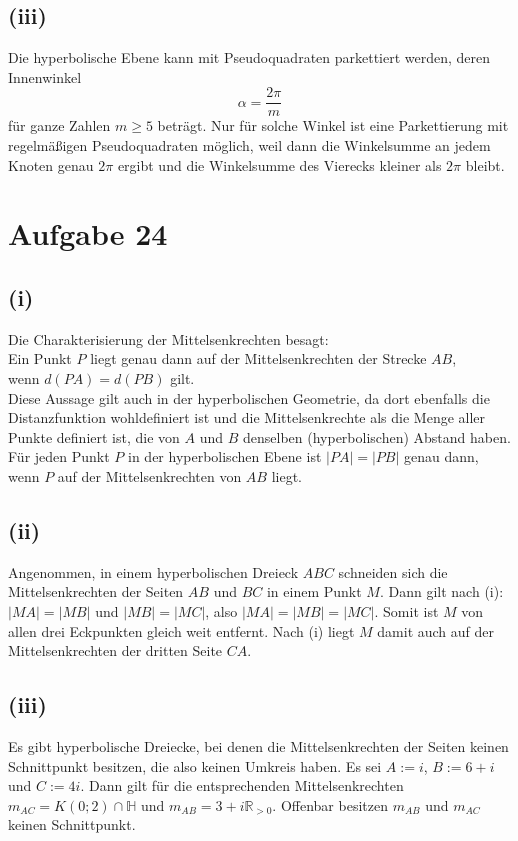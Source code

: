 \documentclass[12pt,a4paper]{article}
\begin{document}
\subsection*{(iii)}
Die hyperbolische Ebene kann mit Pseudoquadraten parkettiert werden, deren Innenwinkel
\[
\alpha = \frac{2\pi}{m}
\]
für ganze Zahlen \(m \geq 5\) beträgt. Nur für solche Winkel ist eine Parkettierung mit regelmäßigen Pseudoquadraten möglich, weil dann die Winkelsumme an jedem Knoten genau \(2\pi\) ergibt und die Winkelsumme des Vierecks kleiner als \(2\pi\) bleibt.

\newpage
\section*{Aufgabe 24}
\subsection*{(i)}
Die Charakterisierung der Mittelsenkrechten besagt: \\
Ein Punkt $P$ liegt genau dann auf der Mittelsenkrechten der Strecke $AB$, \\ 
wenn $d(PA) = d(PB)$ gilt.\\
Diese Aussage gilt auch in der hyperbolischen Geometrie, da dort ebenfalls die Distanzfunktion wohldefiniert ist und die Mittelsenkrechte als die Menge aller Punkte definiert ist, die von $A$ und $B$ denselben (hyperbolischen) Abstand haben.  
Für jeden Punkt $P$ in der hyperbolischen Ebene ist $|PA| = |PB|$ genau dann, wenn $P$ auf der Mittelsenkrechten von $AB$ liegt.

\subsection*{(ii)}
Angenommen, in einem hyperbolischen Dreieck $ABC$ schneiden sich die Mittelsenkrechten der Seiten $AB$ und $BC$ in einem Punkt $M$.  
Dann gilt nach (i): $|MA| = |MB|$ und $|MB| = |MC|$, also $|MA| = |MB| = |MC|$.  
Somit ist $M$ von allen drei Eckpunkten gleich weit entfernt.  
Nach (i) liegt $M$ damit auch auf der Mittelsenkrechten der dritten Seite $CA$.

\subsection*{(iii)}
Es gibt hyperbolische Dreiecke, bei denen die Mittelsenkrechten der Seiten keinen Schnittpunkt besitzen, die also keinen Umkreis haben. Es sei \( A := i \), \( B := 6 + i \) und \( C := 4i \). Dann gilt für die entsprechenden Mittelsenkrechten \( m_{AC} = K(0;2) \cap \mathbb{H} \) und \( m_{AB} = 3 + i\mathbb{R}_{>0} \). Offenbar besitzen \( m_{AB} \) und \( m_{AC} \) keinen Schnittpunkt.
\end{document}
